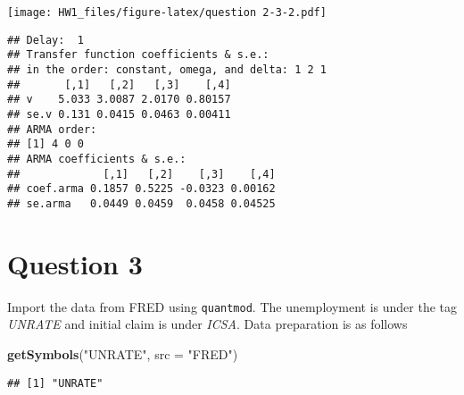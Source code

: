 \documentclass[]{article}
\newenvironment{Shaded}{\begin{snugshade}}{\end{snugshade}}
\newcommand{\KeywordTok}[1]{\textcolor[rgb]{0.13,0.29,0.53}{\textbf{#1}}}
\newcommand{\DataTypeTok}[1]{\textcolor[rgb]{0.13,0.29,0.53}{#1}}
\newcommand{\DecValTok}[1]{\textcolor[rgb]{0.00,0.00,0.81}{#1}}
\newcommand{\StringTok}[1]{\textcolor[rgb]{0.31,0.60,0.02}{#1}}
\newcommand{\OperatorTok}[1]{\textcolor[rgb]{0.81,0.36,0.00}{\textbf{#1}}}
\newcommand{\NormalTok}[1]{#1}
\begin{document}
\begin{Shaded}
\end{Shaded}

\texttt{[image: HW1\_files/figure-latex/question 2-3-2.pdf]}

\begin{Shaded}
\end{Shaded}

\begin{verbatim}
## Delay:  1 
## Transfer function coefficients & s.e.: 
## in the order: constant, omega, and delta: 1 2 1 
##       [,1]   [,2]   [,3]    [,4]
## v    5.033 3.0087 2.0170 0.80157
## se.v 0.131 0.0415 0.0463 0.00411
## ARMA order: 
## [1] 4 0 0
## ARMA coefficients & s.e.: 
##             [,1]   [,2]    [,3]    [,4]
## coef.arma 0.1857 0.5225 -0.0323 0.00162
## se.arma   0.0449 0.0459  0.0458 0.04525
\end{verbatim}

\section{Question 3}\label{question-3}

Import the data from FRED using \texttt{quantmod}. The unemployment is
under the tag \emph{UNRATE} and initial claim is under \emph{ICSA}. Data
preparation is as follows

\begin{Shaded}
\begin{Highlighting}[]
\KeywordTok{getSymbols}\NormalTok{(}\StringTok{"UNRATE"}\NormalTok{, }\DataTypeTok{src =} \StringTok{"FRED"}\NormalTok{)}
\end{Highlighting}
\end{Shaded}

\begin{verbatim}
## [1] "UNRATE"
\end{verbatim}
\end{document}
